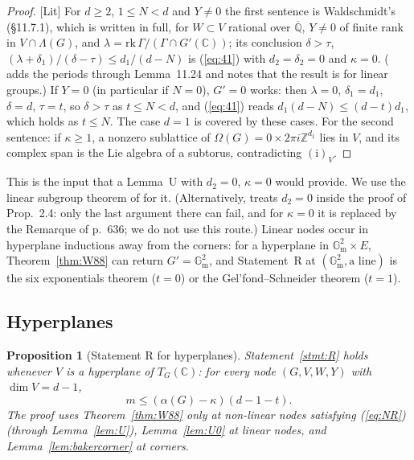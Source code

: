 \documentclass[11pt]{amsart}
\newtheorem{proposition}[theorem]{Proposition}
\theoremstyle{definition}
\newcommand{\Qb}{\overline{\mathbb{Q}}}
\newcommand{\C}{\mathbb{C}}
\newcommand{\Z}{\mathbb{Z}}
\newcommand{\Gm}{\mathbb{G}_{\mathrm m}}
\newcommand{\lab}[1]{\textup{[#1]}}
\begin{document}
\begin{proof}
\lab{Lit} For $d\ge2$, $1\le N<d$ and $Y\ne0$ the first sentence is Waldschmidt's \cite[Thm.~11.21, p.~404]{W00}
(\S11.7.1), which is written in full, for $W\subset V$ rational over $\Qb$, $Y\ne0$ of finite rank in $V\cap\Lambda(G)$, and
$\lambda=\mathrm{rk}\,\Gamma/(\Gamma\cap G'(\C))$; its conclusion $\delta>\tau$, $(\lambda+\delta_1)/(\delta-\tau)\le d_1/(d-N)$
is (\ref{eq:41}) with $d_2=\delta_2=0$ and $\kappa=0$. (\cite[\S11.7.3]{W00} adds the periods through Lemma~11.24 and
notes that the result is \cite[Thm.~4.1]{W88} for linear groups.) If $Y=0$ (in particular if $N=0$), $G'=0$ works: then
$\lambda=0$, $\delta_1=d_1$, $\delta=d$, $\tau=t$, so $\delta>\tau$ as $t\le N<d$, and (\ref{eq:41}) reads
$d_1(d-N)\le(d-t)d_1$, which holds as $t\le N$. The case $d=1$ is covered by these cases. For the second sentence: if $\kappa\ge1$, a nonzero sublattice of $\Omega(G)=0\times2\pi i\Z^{d_1}$ lies in $V$,
and its complex span is the Lie algebra of a subtorus, contradicting $(\mathrm i)_V$.
\end{proof}

\noindent This is the input that a Lemma~U with $d_2=0$, $\kappa=0$ would provide. We use the linear subgroup theorem of
\cite{W00} for it. (Alternatively, \cite[p.~641]{W83} treats $d_2=0$ inside the proof of Prop.~2.4: only the last argument
there can fail, and for $\kappa=0$ it is replaced by the Remarque of p.~636; we do not use this route.) Linear nodes occur in
hyperplane inductions away from the corners: for a hyperplane in $\Gm^2\times E$, Theorem~\ref{thm:W88} can return
$G'=\Gm^2$, and Statement~R at $(\Gm^2,\text{a line})$ is the six exponentials theorem ($t=0$) or the Gel'fond--Schneider
theorem ($t=1$).

\subsection{Hyperplanes}\label{sec:hyp}

\begin{proposition}[Statement R for hyperplanes]\label{prop:hyp}
Statement~\ref{stmt:R} holds whenever $V$ is a hyperplane of $T_G(\C)$: for every node $(G,V,W,Y)$ with $\dim V=d-1$,
\[
m\le(\alpha(G)-\kappa)(d-1-t).
\]
The proof uses Theorem~\ref{thm:W88} only at non-linear nodes satisfying (\ref{eq:NR}) (through Lemma~\ref{lem:U}),
Lemma~\ref{lem:U0} at linear nodes, and Lemma~\ref{lem:bakercorner} at corners.
\end{proposition}
\end{document}

